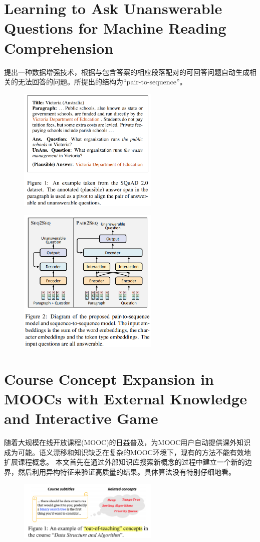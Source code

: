 \documentclass[a4paper,UTF8]{article}
\numberwithin{equation}{section}
\begin{document}
\newpage
\section{Learning to Ask Unanswerable Questions for Machine Reading Comprehension}
提出一种数据增强技术，根据与包含答案的相应段落配对的可回答问题自动生成相关的无法回答的问题。所提出的结构为“pair-to-sequence”。
\begin{figure}[H]
	\centering
	\includegraphics[width=0.6\textwidth]{3-1.png}
\end{figure}
\begin{figure}[H]
	\centering
	\includegraphics[width=0.6\textwidth]{3-2.png}
\end{figure}

\newpage
\section{Course Concept Expansion in MOOCs with External Knowledge and Interactive Game}
随着大规模在线开放课程(MOOC)的日益普及，为MOOC用户自动提供课外知识成为可能。语义漂移和知识缺乏在复杂的MOOC环境下，现有的方法不能有效地扩展课程概念。
本文首先在通过外部知识库搜索新概念的过程中建立一个新的边界，然后利用异构特征来验证高质量的结果。具体算法没有特别仔细地看。
\begin{figure}[H]
	\centering
	\includegraphics[width=0.6\textwidth]{4-1.png}
\end{figure}
\end{document}
